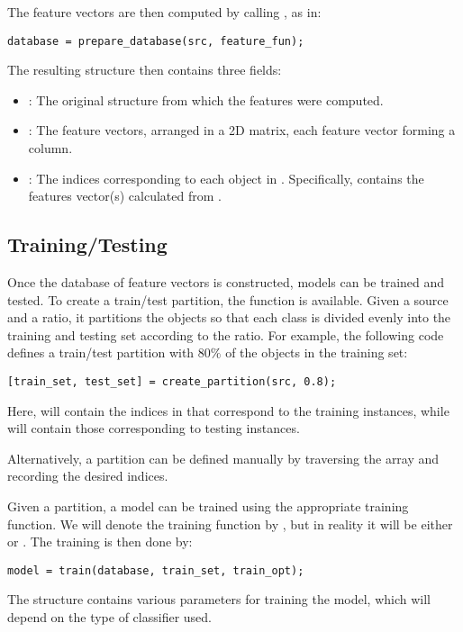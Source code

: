 \documentclass[twocolumn]{article}
\begin{document}
The feature vectors are then computed by calling , as in:
\begin{lstlisting}
database = prepare_database(src, feature_fun);
\end{lstlisting}
The resulting  structure then contains three fields:
\begin{itemize}
	\item {}: The original  structure from which the features were computed.
	\item {}: The feature vectors, arranged in a 2D matrix, each feature vector forming a column.
	\item {}: The indices corresponding to each object in . Specifically,  contains the features vector(s) calculated from .
\end{itemize}

\subsection{Training/Testing}

Once the database of feature vectors is constructed, models can be trained and tested. To create a train/test partition, the function  is available. Given a source  and a ratio, it partitions the objects so that each class is divided evenly into the training and testing set according to the ratio. For example, the following code defines a train/test partition with $80\%$ of the objects in the training set:
\begin{lstlisting}
[train_set, test_set] = create_partition(src, 0.8);
\end{lstlisting}
Here,  will contain the indices in  that correspond to the training instances, while  will contain those corresponding to testing instances.

Alternatively, a partition can be defined manually by traversing the  array and recording the desired indices.

Given a partition, a model can be trained using the appropriate training function. We will denote the training function by , but in reality it will be either  or . The training is then done by:
\begin{lstlisting}
model = train(database, train_set, train_opt);
\end{lstlisting}
The structure  contains various parameters for training the model, which will depend on the type of classifier used.
\end{document}
